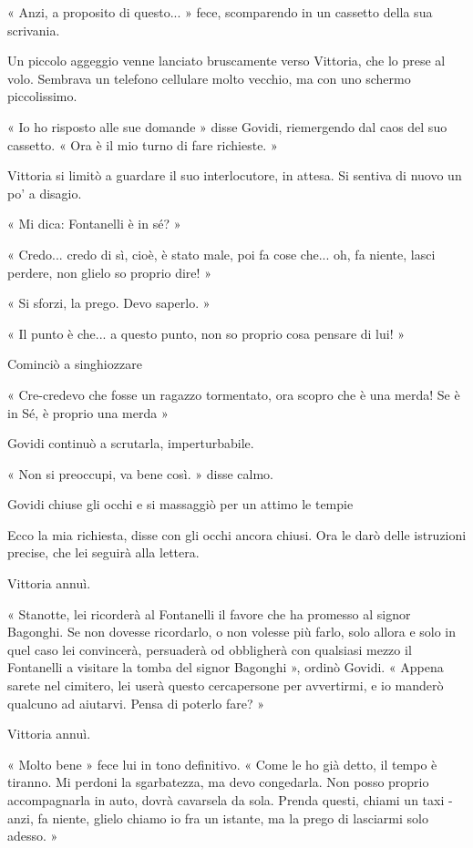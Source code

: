 « Anzi, a proposito di questo... » fece, scomparendo in un cassetto della sua scrivania.

Un piccolo aggeggio venne lanciato bruscamente verso Vittoria, che lo prese al volo. Sembrava un telefono cellulare molto vecchio, ma con uno schermo piccolissimo.

« Io ho risposto alle sue domande » disse Govidi, riemergendo dal caos del suo cassetto. « Ora è il mio turno di fare richieste. »

Vittoria si limitò a guardare il suo interlocutore, in attesa. Si sentiva di nuovo un po' a disagio.

« Mi dica: Fontanelli è in sé? »

« Credo... credo di sì, cioè, è stato male, poi fa cose che... oh, fa niente, lasci perdere, non glielo so proprio dire! »

« Si sforzi, la prego. Devo saperlo. »

« Il punto è che... a questo punto, non so proprio cosa pensare di lui! »

Cominciò a singhiozzare

« Cre-credevo che fosse un ragazzo tormentato, ora scopro che è una merda! Se è in Sé, è proprio una merda »

Govidi continuò a scrutarla, imperturbabile.

« Non si preoccupi, va bene così. » disse calmo. 

Govidi chiuse gli occhi e si massaggiò per un attimo le tempie

Ecco la mia richiesta, disse con gli occhi ancora chiusi. Ora le darò delle istruzioni precise, che lei seguirà alla lettera.

Vittoria annuì.

« Stanotte, lei ricorderà al Fontanelli il favore che ha promesso al signor Bagonghi. Se non dovesse ricordarlo, o non volesse più farlo, solo allora e solo in quel caso lei convincerà, persuaderà od obbligherà con qualsiasi mezzo il Fontanelli a visitare la tomba del signor Bagonghi », ordinò Govidi. « Appena sarete nel cimitero, lei userà questo cercapersone per avvertirmi, e io manderò qualcuno ad aiutarvi. Pensa di poterlo fare? »

Vittoria annuì.

« Molto bene » fece lui in tono definitivo. « Come le ho già detto, il tempo è tiranno. Mi perdoni la sgarbatezza, ma devo congedarla. Non posso proprio accompagnarla in auto, dovrà cavarsela da sola. Prenda questi, chiami un taxi - anzi, fa niente, glielo chiamo io fra un istante, ma la prego di lasciarmi solo adesso. »

